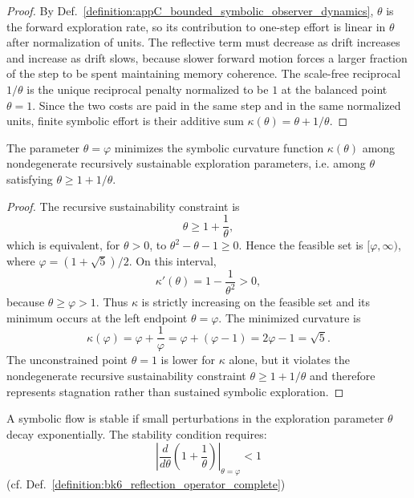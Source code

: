 \begin{proof}
\label{proof:appC_geometric_interpretation_curvature}
By Def.~\ref{definition:appC_bounded_symbolic_observer_dynamics}, $\theta$ is the
forward exploration rate, so its contribution to one-step effort is linear in
$\theta$ after normalization of units. The reflective term must decrease as drift
increases and increase as drift slows, because slower forward motion forces a
larger fraction of the step to be spent maintaining memory coherence. The
scale-free reciprocal $1/\theta$ is the unique reciprocal penalty normalized to
be $1$ at the balanced point $\theta=1$. Since the two costs are paid in the same
step and in the same normalized units, finite symbolic effort is their additive
sum $\kappa(\theta)=\theta+1/\theta$.
\end{proof}

\begin{theorem}
\label{theorem:appC_phi_minimal_curvature_parameter}
The parameter $\theta = \varphi$ minimizes the symbolic curvature function
$\kappa(\theta)$ among nondegenerate recursively sustainable exploration
parameters, i.e. among $\theta$ satisfying $\theta\ge 1+1/\theta$.
\end{theorem}

\begin{proof}
\label{proof:appC_phi_minimal_curvature}
The recursive sustainability constraint is
\[
\theta\ge 1+\frac{1}{\theta},
\]
which is equivalent, for $\theta>0$, to
$\theta^2-\theta-1\ge0$. Hence the feasible set is
$[\varphi,\infty)$, where $\varphi=(1+\sqrt5)/2$. On this interval,
\[
\kappa'(\theta)=1-\frac{1}{\theta^2}>0,
\]
because $\theta\ge\varphi>1$. Thus $\kappa$ is strictly increasing on the feasible
set and its minimum occurs at the left endpoint $\theta=\varphi$. The minimized
curvature is
\[
\kappa(\varphi)=\varphi+\frac1\varphi=\varphi+(\varphi-1)=2\varphi-1=\sqrt5.
\]
The unconstrained point $\theta=1$ is lower for $\kappa$ alone, but it violates
the nondegenerate recursive sustainability constraint $\theta\ge1+1/\theta$ and
therefore represents stagnation rather than sustained symbolic exploration.
\end{proof}

\begin{definition}
\label{definition:appC_symbolic_flow_stability}
A symbolic flow is stable if small perturbations in the exploration parameter $\theta$ decay exponentially. The stability condition requires:
\[
\left| \frac{d}{d\theta} \left( 1 + \frac{1}{\theta} \right) \right|_{\theta=\varphi} < 1
\]
(cf. Def.~\ref{definition:bk6_reflection_operator_complete})
\end{definition}

